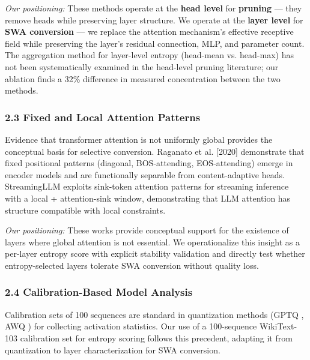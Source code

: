 \textit{Our positioning:} These methods operate at the \textbf{head level} for \textbf{pruning} --- they remove heads while preserving layer structure. We operate at the \textbf{layer level} for \textbf{SWA conversion} --- we replace the attention mechanism's effective receptive field while preserving the layer's residual connection, MLP, and parameter count. The aggregation method for layer-level entropy (head-mean vs. head-max) has not been systematically examined in the head-level pruning literature; our ablation finds a 32\% difference in measured concentration between the two methods.

\subsubsection{2.3 Fixed and Local Attention Patterns}

Evidence that transformer attention is not uniformly global provides the conceptual basis for selective conversion. Raganato et al. [2020] demonstrate that fixed positional patterns (diagonal, BOS-attending, EOS-attending) emerge in encoder models and are functionally separable from content-adaptive heads. StreamingLLM \citep{Xiao2024StreamingLLM} exploits sink-token attention patterns for streaming inference with a local + attention-sink window, demonstrating that LLM attention has structure compatible with local constraints.

\textit{Our positioning:} These works provide conceptual support for the existence of layers where global attention is not essential. We operationalize this insight as a per-layer entropy score with explicit stability validation and directly test whether entropy-selected layers tolerate SWA conversion without quality loss.

\subsubsection{2.4 Calibration-Based Model Analysis}

Calibration sets of 100 sequences are standard in quantization methods (GPTQ \citep{Frantar2023}, AWQ \citep{Lin2024}) for collecting activation statistics. Our use of a 100-sequence WikiText-103 calibration set for entropy scoring follows this precedent, adapting it from quantization to layer characterization for SWA conversion.

